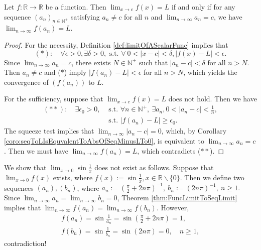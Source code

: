 \begin{thm}
  \label{thm:FuncLimitToSeqLimit}
  Let $f:\mathbb{R}\rightarrow \mathbb{R}$ be a function.
  Then $\lim_{x\rightarrow c}f(x)=L$ if and only if
  for any sequence $(a_{n})_{n\in \mathbb{N}^{+}}$ satisfying
  $a_{n}\neq c$ for all $n$ and
  $\lim_{n\rightarrow\infty}a_{n}=c$, we have
  $\lim_{n\rightarrow \infty}f(a_{n})=L$.
\end{thm}
\begin{proof}
  For the necessity, Definition \ref{def:limitOfAScalarFunc}
  implies that
  \begin{displaymath}
    (*):\quad
    \forall \epsilon>0, \exists \delta>0,\text{ s.t. }
    \forall\ 0<|x-c|<\delta, |f(x)-L|<\epsilon.
  \end{displaymath}
  Since $\lim_{n\rightarrow\infty}a_{n}=c$, there exists $N\in \mathbb{N}^{+}$
  such that $|a_{n}-c|<\delta$ for all $n>N$. Then $a_{n}\neq c$ and
  ($\ast$) imply $|f(a_{n})-L|<\epsilon$ for all $n>N$, which yields
  the convergence of $(f(a_{n}))$ to $L$.

  For the sufficiency, suppose that $\lim_{x\rightarrow c}f(x)=L$
  does not hold. Then we have
  \begin{align*}
    (**): \quad
    \exists \epsilon_{0}>0,&\text{ s.t. }
    \forall n\in \mathbb{N}^{+},\ \exists a_{n}, 0<|a_{n}-c|<\frac{1}{n},\\
    &\text{ s.t. } |f(a_{n})-L|\ge \epsilon_{0}.
  \end{align*}
  The squeeze test implies that
  $\lim_{n\rightarrow\infty}|a_{n}-c|=0$, which,
  by Corollary
  \ref{coro:seqToLIsEquvalentToAbsOfSeqMinusLTo0},
  is equivalent to
  $\lim_{n\rightarrow\infty}a_{n}=c$.
  Then we must have
  $\lim_{n\rightarrow\infty}f(a_{n})=L$,
  which contradicts ($\ast\ast$).
\end{proof}

\begin{exm}
  \label{exm:nonexistLimitForShowingEpsDelt}
  We show that $\lim_{x\rightarrow 0}\sin \frac{1}{x}$ does not exist
  as follows. Suppose that $\lim_{x\rightarrow 0}f(x)$ exists, where
  $f(x):=\sin \frac{1}{x}, x\in \mathbb{R}\backslash \{0\}.$
  Then we define two sequences $(a_{n}),(b_{n})$, where
  $a_{n}:=(\frac{\pi}{2}+2n\pi)^{-1},\
      b_{n}:=(2n\pi)^{-1},\ n\ge 1.$
  Since $\lim_{n\rightarrow\infty}a_{n}=\lim_{n\rightarrow\infty}b_{n}=0$,
  Theorem \ref{thm:FuncLimitToSeqLimit} implies
  that $\lim_{n\rightarrow\infty}f(a_{n})=\lim_{n\rightarrow\infty}f(b_{n})$.
  However,
  \begin{displaymath}
    \begin{array}{l}
      f(a_{n})=\sin \frac{1}{a_{n}}=\sin(\frac{\pi}{2}+2n\pi)=1,\\
      f(b_{n})=\sin \frac{1}{b_{n}}=\sin(2n\pi)=0,\quad n\ge 1,
    \end{array}
  \end{displaymath}
  contradiction!
\end{exm}

